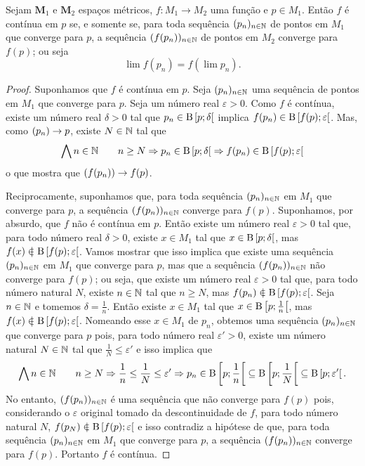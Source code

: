 \begin{proposition}
Sejam $\bm M_1$ e $\bm M_2$ espaços métricos, $f: M_1 \to M_2$ uma função e $p \in M_1$. Então $f$ é contínua em $p$ se, e somente se, para toda sequência $(p_n)_{n \in \mathbb{N}}$ de pontos em $M_1$ que converge para $p$, a sequência $(f(p_n))_{n \in \mathbb{N}}$ de pontos em $M_2$ converge para $f(p)$; ou seja
	\begin{equation*}
	\lim f(p_n) = f(\lim p_n).
	\end{equation*}
\end{proposition}
\begin{proof}
	Suponhamos que $f$ é contínua em $p$. Seja $(p_n)_{n \in \mathbb{N}}$ uma sequência de pontos em $M_1$ que converge para $p$. Seja um número real $\varepsilon > 0$. Como $f$ é contínua, existe um número real $\delta > 0$ tal que $p_n \in \mathrm{B}\left[{p};{\delta}\right[$ implica $f(p_n) \in \mathrm{B}\left[{f(p)};{\varepsilon}\right[$. Mas, como $(p_n) \rightarrow p$, existe $N \in \mathbb{N}$ tal que
	\begin{equation*}
	\bigwedge\nolimits n \in \mathbb{N} \qquad n \geq N \Rightarrow p_n \in \mathrm{B}\left[{p};{\delta}\right[ \Rightarrow f(p_n) \in \mathrm{B}\left[{f(p)};{\varepsilon}\right[
	\end{equation*}
o que mostra que $(f(p_n)) \rightarrow f(p)$.
	
	Reciprocamente, suponhamos que, para toda sequência $(p_n)_{n \in \mathbb{N}}$ em $M_1$ que converge para $p$, a sequência $(f(p_n))_{n \in \mathbb{N}}$ converge para $f(p)$. Suponhamos, por absurdo, que $f$ não é contínua em $p$. Então existe um número real $\varepsilon > 0$ tal que, para todo número real $\delta > 0$, existe $x \in M_1$ tal que $x \in \mathrm{B}\left[{p};{\delta}\right[$, mas $f(x) \notin \bola{f(p)}{\varepsilon}$. Vamos mostrar que isso implica que existe uma sequência $(p_n)_{n \in \mathbb{N}}$ em $M_1$ que converge para $p$, mas que a sequência $(f(p_n))_{n \in \mathbb{N}}$ não converge para $f(p)$; ou seja, que existe um número real $\varepsilon > 0$ tal que, para todo número natural $N$, existe $n \in \mathbb{N}$ tal que $n \geq N$, mas $f(p_n) \notin \bola{f(p)}{\varepsilon}$. Seja $n \in \mathbb{N}$ e tomemos $\delta = \frac{1}{n}$. Então existe $x \in M_1$ tal que $x \in \mathrm{B}\left[{p};{\frac{1}{n}}\right[$, mas $f(x) \notin \bola{f(p)}{\varepsilon}$. Nomeando esse $x \in M_1$ de $p_n$, obtemos uma sequência $(p_n)_{n \in \mathbb{N}}$ que converge para $p$ pois, para todo número real $\varepsilon' > 0$, existe um número natural $N \in \mathbb{N}$ tal que $\frac{1}{N} \leq \varepsilon'$ e isso implica que
\begin{equation*}
	\bigwedge\nolimits n \in \mathbb{N} \qquad n \geq N \Rightarrow \frac{1}{n} \leq \frac{1}{N} \leq \varepsilon' \Rightarrow p_n \in \mathrm{B}\left[{p};{\frac{1}{n}}\right[ \subseteq \mathrm{B}\left[{p};{\frac{1}{N}}\right[ \subseteq \mathrm{B}\left[{p};{\varepsilon'}\right[.
	\end{equation*}
	No entanto, $(f(p_n))_{n \in \mathbb{N}}$ é uma sequência que não converge para $f(p)$ pois, considerando o $\varepsilon$ original tomado da descontinuidade de $f$, para todo número natural $N$, $f(p_N) \notin \bola{f(p)}{\varepsilon}$ e isso contradiz a hipótese de que, para toda sequência $(p_n)_{n \in \mathbb{N}}$ em $M_1$ que converge para $p$, a sequência $(f(p_n))_{n \in \mathbb{N}}$ converge para $f(p)$. Portanto $f$ é contínua.	
\end{proof}


